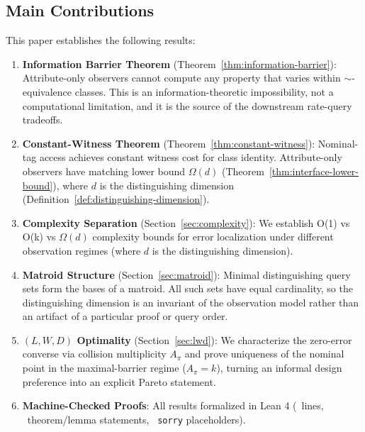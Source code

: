 \subsection{Main Contributions}

This paper establishes the following results:

\begin{enumerate}
\item \textbf{Information Barrier Theorem} (Theorem~\ref{thm:information-barrier}): Attribute-only observers cannot compute any property that varies within $\sim$-equivalence classes. This is an information-theoretic impossibility, not a computational limitation, and it is the source of the downstream rate-query tradeoffs.

\item \textbf{Constant-Witness Theorem} (Theorem~\ref{thm:constant-witness}): Nominal-tag access achieves constant witness cost for class identity. Attribute-only observers have matching lower bound $\Omega(d)$ (Theorem~\ref{thm:interface-lower-bound}), where $d$ is the distinguishing dimension (Definition~\ref{def:distinguishing-dimension}).

\item \textbf{Complexity Separation} (Section~\ref{sec:complexity}): We establish O(1) vs O(k) vs $\Omega(d)$ complexity bounds for error localization under different observation regimes (where $d$ is the distinguishing dimension).

\item \textbf{Matroid Structure} (Section~\ref{sec:matroid}): Minimal distinguishing query sets form the bases of a matroid. All such sets have equal cardinality, so the distinguishing dimension is an invariant of the observation model rather than an artifact of a particular proof or query order.

\item \textbf{$(L, W, D)$ Optimality} (Section~\ref{sec:lwd}): We characterize the zero-error converse via collision multiplicity $A_\pi$ and prove uniqueness of the nominal point in the maximal-barrier regime ($A_\pi=k$), turning an informal design preference into an explicit Pareto statement.

\item \textbf{Machine-Checked Proofs}: All results formalized in Lean 4 (\LeanTotalLines\ lines, \LeanTotalTheorems\ theorem/lemma statements, \LeanTotalSorry\ \texttt{sorry} placeholders).
\end{enumerate}

